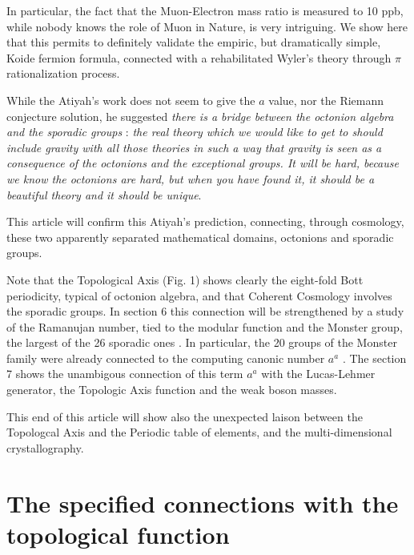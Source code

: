 \documentclass[a4paper,9pt]{article}
\begin{document}
      
   In particular, the fact that the Muon-Electron mass ratio is measured to 10 ppb, while nobody knows the role of Muon in Nature, is very intriguing. We show here that this permits to definitely validate the empiric, but dramatically simple, Koide fermion formula, connected with a rehabilitated Wyler's theory through $\pi$ rationalization process. 
   
   
   While the Atiyah's work does not seem to give the $a$ value, nor the Riemann conjecture solution, he suggested \cite{Atiyah1} \textit{there is a bridge between the octonion algebra and the sporadic groups} : \textit {the real theory which we would like to get to should include gravity with all those theories in such a way that gravity is seen as a consequence of the octonions and the exceptional groups. It will be hard, because we know the octonions are hard, but when you have found it, it should be a beautiful theory and it should be unique}. 
   
   
   
   This article will confirm this Atiyah's prediction, connecting, through cosmology, these two apparently separated mathematical domains, octonions and sporadic groups.
   
   
   
   Note that the Topological Axis (Fig. 1) shows clearly the eight-fold Bott periodicity, typical of octonion algebra, and that Coherent Cosmology involves the sporadic groups. In section 6 this connection will be strengthened by a study of the Ramanujan number, tied to the modular function and the Monster group, the largest of the 26 sporadic ones \cite{Conway} \cite{Borcherds}. In particular, the 20 groups of the Monster family were already connected to the computing canonic number $a^a$ \cite{Sanchez}. The section 7 shows the unambigous connection of this term $a^a$ with the Lucas-Lehmer generator, the Topologic Axis function and the weak boson masses.  
   
   
   This end of this article will show also the unexpected laison between the Topologcal Axis and the Periodic table of elements, and the multi-dimensional crystallography.
   
   
   
   
   
   
   
   
   \section{The specified connections with the topological function}
\end{document}
